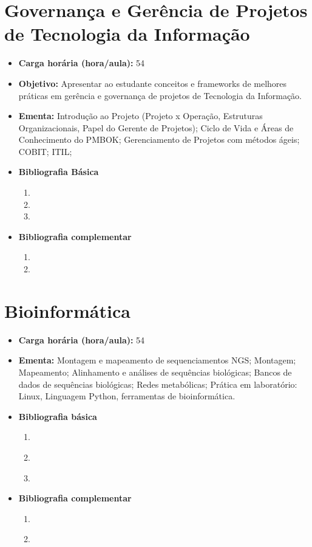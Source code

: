 \documentclass[
	10pt,				%
	openright,			%
	twoside,			%
	a4paper,			%
	english,			%
	french,				%
	brazil,				%
	sumario=tradicional
]{abntex2}
\begin{document}
\section*{Governança e Gerência de Projetos de Tecnologia da Informação}\label{6_opt01}
\begin{itemize}
	\item \textbf{Carga horária (hora/aula):} 54
	\item \textbf{Objetivo:} Apresentar ao estudante conceitos e frameworks de melhores práticas em gerência e governança de projetos de Tecnologia da Informação.
	\item \textbf{Ementa:} 
	Introdução ao Projeto (Projeto x Operação, Estruturas Organizacionais, Papel do Gerente de Projetos);
	Ciclo de Vida e Áreas de Conhecimento do PMBOK;
	Gerenciamento de Projetos com métodos ágeis;
	COBIT;
	ITIL;
	\item \textbf{Bibliografia Básica}
	\begin{enumerate}
		\item 
		\item 
		\item 
	\end{enumerate}
	\item \textbf{Bibliografia complementar}
	\begin{enumerate}
		\item 
		\item
	\end{enumerate} 	
\end{itemize}

\newpage
\section*{Bioinformática}\label{6_opt02}
\begin{itemize}
	\item \textbf{Carga horária (hora/aula):} 54		
	\item \textbf{Ementa:} 
	Montagem e mapeamento de sequenciamentos NGS; 
	Montagem; Mapeamento; 
	Alinhamento e análises de sequências biológicas; 
	Bancos de dados de sequências biológicas; 
	Redes metabólicas; 
	Prática em laboratório: Linux, Linguagem Python, ferramentas de bioinformática.
	\item \textbf{Bibliografia básica}
	\begin{enumerate}
		\item \cite{cormen2002algoritmos}
		\item \cite{lesk2019}
		\item \cite{verli2014}
	\end{enumerate}
	\item \textbf{Bibliografia complementar}
	\begin{enumerate}
		\item \cite{goodwin2016}
		\item \cite{setubal1997}
	\end{enumerate}	
\end{itemize}
\end{document}
